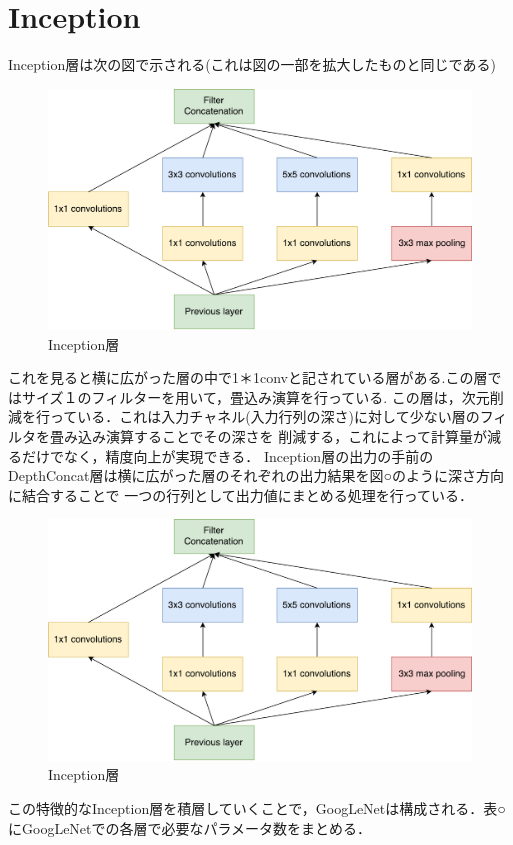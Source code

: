 {\section{Inception}
\label{sec:inception}
Inception層は次の図で示される(これは図の一部を拡大したものと同じである)
\begin{figure}[h]
  \centering
  \includegraphics[width=12cm]{./chap2/fig/inception.pdf}
  \caption{Inception層}
  \label{fig:inception}
\end{figure}
これを見ると横に広がった層の中で1＊1convと記されている層がある.この層ではサイズ１のフィルターを用いて，畳込み演算を行っている.
この層は，次元削減を行っている．これは入力チャネル(入力行列の深さ)に対して少ない層のフィルタを畳み込み演算することでその深さを
削減する，これによって計算量が減るだけでなく，精度向上が実現できる．
Inception層の出力の手前のDepthConcat層は横に広がった層のそれぞれの出力結果を図○のように深さ方向に結合することで
一つの行列として出力値にまとめる処理を行っている．
\begin{figure}[h]
  \centering
  \includegraphics[width=12cm]{./chap2/fig/inception.pdf}
  \caption{Inception層}
  \label{fig:inception}
\end{figure}
この特徴的なInception層を積層していくことで，GoogLeNetは構成される．表○にGoogLeNetでの各層で必要なパラメータ数をまとめる．

}
